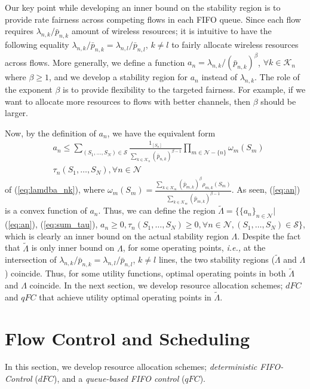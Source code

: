 \documentclass[conference]{IEEEtran}
\newcommand{\ie}{{\em i.e., }}
\newcommand{\Sset}{\mathcal{S}}
\newcommand{\Kset}{\mathcal{K}}
\newcommand{\Nset}{\mathcal{N}}
\begin{document}
Our key point while developing an inner bound on the stability region is to provide rate fairness across competing flows in each FIFO queue. Since each flow requires ${\lambda_{n,k}}/{\bar{p}_{n,k}}$ amount of wireless resources; it is intuitive to have the following equality ${\lambda_{n,k}}/{\bar{p}_{n,k}} = {\lambda_{n,l}}/{\bar{p}_{n,l}}$, $k \neq l$ to fairly allocate wireless resources across flows. More generally, we define a function $a_n = \lambda_{n,k}/(\bar{p}_{n,k})^{\beta}$, $\forall k \in \Kset_{n}$ where $\beta \geq 1$, and we develop a stability region for $a_n$ instead of $\lambda_{n,k}$. The role of the exponent $\beta$ is to provide  flexibility to the targeted fairness. For example, if we want to allocate more resources to flows with better channels, then $\beta$ should be larger. 

Now, by the definition of  $a_n$, we have the equivalent form
\begin{align} \label{eq:an}
& a_n \leq \sum_{(S_1, \ldots, S_N) \in \Sset} \frac{1_{[S_n]}}{\sum_{k \in \Kset_{n}} (\bar{p}_{n,k})^{\beta-1}} \prod_{m \in \Nset - \{n\}}  \omega_{m}(S_{m}) \nonumber \\
& \tau_{n}(S_1, \ldots, S_N), \forall n \in \Nset
\end{align} of (\ref{eq:lamdba_nk}), where $\omega_{m}(S_m) = \frac{\sum_{k \in \Kset_{m}}  (\bar{p}_{m,k})^{\beta} \rho_{m,k}(S_{m}) }{\sum_{k \in \Kset_{m}} (\bar{p}_{m,k})^{\beta-1} }$. As seen, (\ref{eq:an}) is a convex function of $a_n$. 
Thus, we can define the region $\tilde{\Lambda} = \{ \{a_n\}_{n \in \Nset}|$ (\ref{eq:an}), (\ref{eq:sum_tau}),  $a_{n} \geq 0, \tau_{n}(S_1, \ldots, S_N) \geq 0, \forall n \in \Nset, (S_1, \ldots, S_{N}) \in \Sset \}$, which is clearly an inner bound on the actual stability region $\Lambda$. 
Despite the fact that $\tilde{\Lambda}$ is only inner bound on $\Lambda$, for some operating points, \ie at the intersection of  ${\lambda_{n,k}}/{\bar{p}_{n,k}} = {\lambda_{n,l}}/{\bar{p}_{n,l}}$, $k \neq l$ lines, the two stability regions ($\tilde{\Lambda}$ and $\Lambda$) coincide. Thus, for some utility functions, optimal operating points in both $\tilde{\Lambda}$ and $\Lambda$ coincide.
In the next section, we develop resource allocation schemes; $dFC$ and $qFC$ that achieve utility optimal operating points in $\tilde{\Lambda}$.



\section{Flow Control and Scheduling} \label{sec:oFC_qFC}
In this section, we develop resource allocation schemes; {\em deterministic FIFO-Control} ($dFC$), and a {\em queue-based FIFO control} ($qFC$). 
\end{document}
